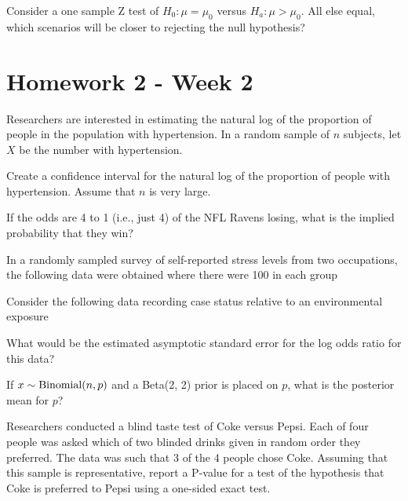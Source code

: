 \documentclass{homework}
\begin{document}
\begin{tcolorbox}[title=Question 13]
Consider a one sample Z test of $H_0 : \mu = \mu_0$ versus $H_a : \mu > \mu_0$. All else equal, which scenarios will be closer to rejecting the null hypothesis?
\end{tcolorbox}

\clearpage

\section{Homework 2 - Week 2}

\begin{tcolorbox}[title=Question 1]
Researchers are interested in estimating the natural log of the proportion of people in the population with hypertension. In a random sample of $n$ subjects, let ${X}$ be the number with hypertension. 

Create a confidence interval for the natural log of the proportion of people with hypertension. Assume that $n$ is very large.
\end{tcolorbox}

\begin{tcolorbox}[title=Question 2]
If the odds are 4 to 1 (i.e., just 4) of the NFL Ravens losing, what is the implied probability that they win? 
\end{tcolorbox}

\begin{tcolorbox}[title=Question 3]
In a randomly sampled survey of self-reported stress levels from two occupations, the following data were obtained where there were 100 in each group 
\end{tcolorbox}

\begin{tcolorbox}[title=Question 4]
Consider the following data recording case status relative to an environmental exposure


What would be the estimated asymptotic standard error for the log odds ratio for this data?
\end{tcolorbox}

\begin{tcolorbox}[title=Question 5]
If $x \sim \textnormal{Binomial}(n, p)$ and a Beta(2, 2) prior is placed on $p$, what is the posterior mean for $p$?
\end{tcolorbox}

\begin{tcolorbox}[title=Question 6]
Researchers conducted a blind taste test of Coke versus Pepsi. Each of four people was asked which of two blinded drinks given in random order they preferred. The data was such that 3 of the 4 people chose Coke. Assuming that this sample is representative, report a P-value for a test of the hypothesis that Coke is preferred to Pepsi using a one-sided exact test.
\end{tcolorbox}
\clearpage
\end{document}
